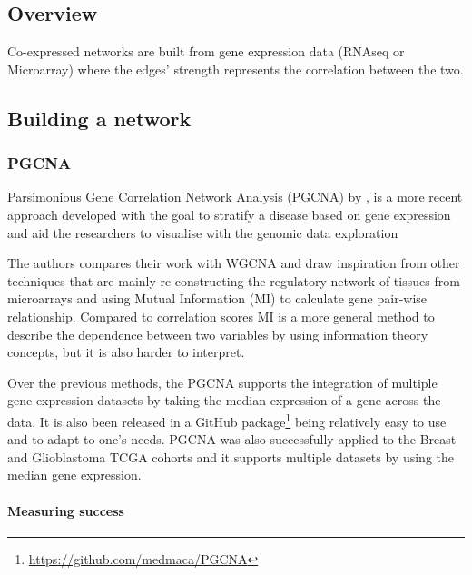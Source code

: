 \subsection{Overview} \label{s:lit:co_net}

Co-expressed networks are built from gene expression data (RNAseq or Microarray) where the edges' strength represents the correlation between the two. 





\subsection{Building a network}

\subsubsection{PGCNA}

Parsimonious Gene Correlation Network Analysis (PGCNA) by \citet{Care2019-ij}, is a more recent  approach developed with the goal to stratify a disease based on gene expression and aid the researchers to visualise with the genomic data exploration

The authors compares their work with WGCNA and draw inspiration from other techniques that are mainly re-constructing the regulatory network of tissues from microarrays and using Mutual Information (MI) \citet{Margolin2006-mc,Zhang2013-fs} to calculate gene pair-wise relationship. Compared to correlation scores MI is a more general method to describe the dependence between two variables by using information theory concepts, but it is also harder to interpret.

Over the previous methods, the PGCNA supports the integration of multiple gene expression datasets by taking the median expression of a gene across the data. It is also been released in a GitHub package\footnote{\url{https://github.com/medmaca/PGCNA} } being relatively easy to use and to adapt to one's needs. PGCNA was also successfully applied to the Breast and Glioblastoma TCGA cohorts and it supports multiple datasets by using the median gene expression.

\paragraph*{Measuring success}

